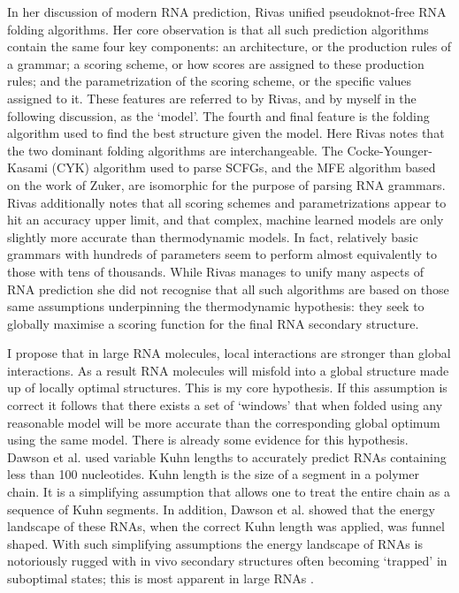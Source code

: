 \documentclass{cshonours}
\begin{document}
In her discussion of modern RNA prediction, Rivas \cite{rivas2013four} unified pseudoknot-free RNA folding algorithms. Her core observation is that all such prediction algorithms contain the same four key components: an architecture, or the production rules of a grammar; a scoring scheme, or how scores are assigned to these production rules; and the parametrization of the scoring scheme, or the specific values assigned to it. These features are referred to by Rivas, and by myself in the following discussion, as the `model'. The fourth and final feature is the folding algorithm used to find the best structure given the model. Here Rivas notes that the two dominant folding algorithms are interchangeable. The Cocke-Younger-Kasami (CYK) algorithm used to parse SCFGs, and the MFE algorithm based on the work of Zuker, are isomorphic for the purpose of parsing RNA grammars. Rivas additionally notes that all scoring schemes and parametrizations appear to hit an accuracy upper limit, and that complex, machine learned models are only slightly more accurate than thermodynamic models. In fact, relatively basic grammars with hundreds of parameters seem to perform almost equivalently to those with tens of thousands. While Rivas manages to unify many aspects of RNA prediction she did not recognise that all such algorithms are based on those same assumptions underpinning the thermodynamic hypothesis: they seek to globally maximise a scoring function for the final RNA secondary structure. 

I propose that in large RNA molecules, local interactions are stronger than global interactions. As a result RNA molecules will misfold into a global structure made up of locally optimal structures. This is my core hypothesis. If this assumption is correct it follows that there exists a set of `windows' that when folded using any reasonable model will be more accurate than the corresponding global optimum using the same model. There is already some evidence for this hypothesis. Dawson et al. \cite{dawson2013new} used variable Kuhn lengths to accurately predict RNAs containing less than 100 nucleotides. Kuhn length is the size of a segment in a polymer chain. It is a simplifying assumption that allows one to treat the entire chain as a sequence of Kuhn segments. In addition, Dawson et al. showed that the energy landscape of these RNAs, when the correct Kuhn length was applied, was funnel shaped. With such simplifying assumptions the energy landscape of RNAs is notoriously rugged with in vivo secondary structures often becoming `trapped' in suboptimal states; this is most apparent in large RNAs \cite{ditzler2008rugged}.
\end{document}
